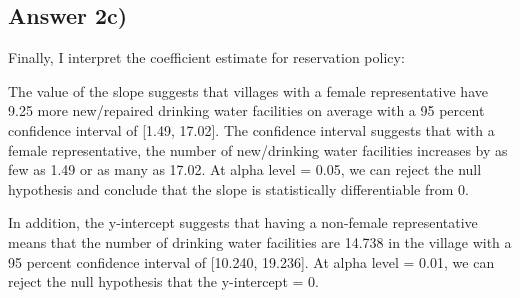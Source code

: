 \documentclass{article}
\begin{document}
\subsection{Answer 2c)}
Finally, I interpret the coefficient estimate for reservation policy:
\vspace{0.5cm}

\noindent The value of the slope suggests that villages with a female representative have 9.25 more new/repaired drinking water facilities on average with a 95 percent confidence interval of [1.49, 17.02]. The confidence interval suggests that with a female representative, the number of new/drinking water facilities increases by as few as 1.49 or as many as 17.02. 
At alpha level = 0.05, we can reject the null hypothesis and conclude that the slope is statistically differentiable from 0. 
\vspace{0.5cm}

\noindent In addition, the y-intercept suggests that having a non-female representative means that the number of drinking water facilities are 14.738 in the village with a 95 percent confidence interval of [10.240, 19.236]. At alpha level = 0.01, we can reject the null hypothesis that the y-intercept = 0.
\end{document}
